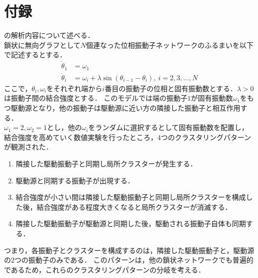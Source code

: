 \documentclass[../main]{subfiles}
\begin{document}
\chapter{付録}
\label{chap:appendix}
\cite{XiaHuang:130506}の解析内容について述べる．\\
鎖状に無向グラフとして$N$個連なった位相振動子ネットワークのふるまいを以下で記述するとする．
\begin{align*}
    \dot{\theta}_1&=\omega_1\\
    \dot{\theta}_i&=\omega_i+\lambda\sin(\theta_{i-1}-\theta_i),\ i=2,3,\ldots,N
\end{align*}
ここで，$\theta_i,\omega_i$をそれぞれ端から$i$番目の振動子の位相と固有振動数とする．$\lambda>0$は振動子間の結合強度とする．
このモデルでは端の振動子$1$が固有振動数$\omega_1$をもつ駆動源となり，他の振動子は駆動源に近い方の隣接した振動子と相互作用する．\\

$\omega_1=2,\omega_2=1$とし，他の$\omega_i$をランダムに選択するとして固有振動数を配置し，結合強度を高めていく数値実験を行ったところ，4つのクラスタリングパターンが観測された．
\renewcommand{\labelenumi}{Case \theenumi}
\begin{enumerate}
    \item \label{enu:case1} 隣接した駆動振動子と同期し局所クラスターが発生する．
    \item \label{enu:case2} 駆動源と同期する振動子が出現する．
    \item \label{enu:case3} 結合強度が小さい間は隣接した駆動振動子と同期し局所クラスターを構成した後，結合強度がある程度大きくなると局所クラスターが消滅する．
    \item \label{enu:case4} 隣接した駆動振動子が駆動源と同期した後，駆動される振動子自体も同期する．
\end{enumerate}
つまり，各振動子とクラスターを構成するのは，隣接した駆動振動子と，駆動源の2つの振動子のみである．
このパターンは，他の鎖状ネットワークでも普遍的であるため，これらのクラスタリングパターンの分岐を考える．
\end{document}
